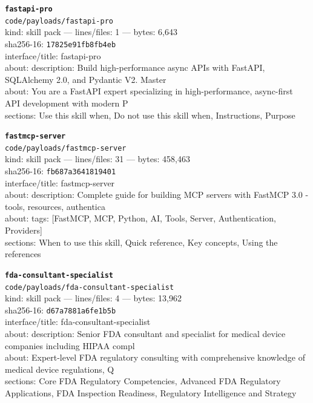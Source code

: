 \noindent\textbf{\texttt{fastapi-pro}}\\
\texttt{code/payloads/fastapi-pro}\\
kind: skill pack --- lines/files: 1 --- bytes: 6,643\\
sha256-16: \texttt{17825e91fb8fb4eb}\\
interface/title: fastapi-pro\\
about: description: Build high-performance async APIs with FastAPI, SQLAlchemy 2.0, and Pydantic V2. Master\\
about: You are a FastAPI expert specializing in high-performance, async-first API development with modern P\\
sections: Use this skill when, Do not use this skill when, Instructions, Purpose\\
\vspace*{6.0pt}

\noindent\textbf{\texttt{fastmcp-server}}\\
\texttt{code/payloads/fastmcp-server}\\
kind: skill pack --- lines/files: 31 --- bytes: 458,463\\
sha256-16: \texttt{fb687a3641819401}\\
interface/title: fastmcp-server\\
about: description: Complete guide for building MCP servers with FastMCP 3.0 - tools, resources, authentica\\
about: tags: [FastMCP, MCP, Python, AI, Tools, Server, Authentication, Providers]\\
sections: When to use this skill, Quick reference, Key concepts, Using the references\\
\vspace*{6.0pt}

\noindent\textbf{\texttt{fda-consultant-specialist}}\\
\texttt{code/payloads/fda-consultant-specialist}\\
kind: skill pack --- lines/files: 4 --- bytes: 13,962\\
sha256-16: \texttt{d67a7881a6fe1b5b}\\
interface/title: fda-consultant-specialist\\
about: description: Senior FDA consultant and specialist for medical device companies including HIPAA compl\\
about: Expert-level FDA regulatory consulting with comprehensive knowledge of medical device regulations, Q\\
sections: Core FDA Regulatory Competencies, Advanced FDA Regulatory Applications, FDA Inspection Readiness, Regulatory Intelligence and Strategy\\
\vspace*{6.0pt}

